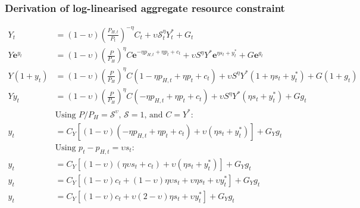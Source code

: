 \subsubsection{Derivation of log-linearised aggregate resource constraint}
\begin{align}\label{eq:appendix_log_rc_beginning}
    Y_t &= (1-\upsilon)\left(\frac{P_{H,t}}{P_t}\right)^{-\eta}C_t + \upsilon \mathcal{S}_t^{\eta}Y_t^* + G_t\\
    Y \mathbf{e}^{y_t} &= (1-\upsilon)\left(\frac{P}{P_{H}}\right)^{\eta}C \mathbf{e}^{-\eta p_{H,t} + \eta p_t + c_t}+ \upsilon S^{\eta} Y^* \mathbf{e}^{\eta s_t + y^*_t} + G \mathbf{e}^{g_t}\\
    Y ({1+y_t}) &= (1-\upsilon)\left(\frac{P}{P_{H}}\right)^{\eta}C ({1 -\eta p_{H,t} + \eta p_t + c_t})+ \upsilon S^{\eta} Y^* ({1 + \eta s_t + y^*_t}) + G ({1+ g_t})\\
    Y y_t &= (1-\upsilon)\left(\frac{P}{P_{H}}\right)^{\eta}C ({-\eta p_{H,t} + \eta p_t + c_t})+ \upsilon S^{\eta} Y^* ({\eta s_t + y^*_t}) + G g_t\\
    &\text{Using $P/P_H = \mathcal{S}^\upsilon$, $\mathcal{S} = 1$, and $C=Y^*$}:\nonumber\\
    y_t &= C_Y\left[(1-\upsilon)({-\eta p_{H,t} + \eta p_t + c_t})+ \upsilon ({\eta s_t + y^*_t})\right] + G_Y g_t\\
    &\text{Using $p_t - p_{H,t} = \upsilon s_t$}:\nonumber\\
    y_t &= C_Y\left[(1-\upsilon)({\eta \upsilon s_t + c_t})+ \upsilon ({\eta s_t + y^*_t})\right] + G_Y g_t\\
    y_t &= C_Y\left[(1-\upsilon)c_t + (1-\upsilon) \eta \upsilon s_t + \upsilon {\eta s_t} + \upsilon y^*_t\right] + G_Y g_t\\
    y_t &= C_Y\left[(1-\upsilon)c_t + \upsilon (2-\upsilon)\eta s_t + \upsilon y^*_t\right] + G_Y g_t \label{eq:appendix_log_rc_end}
\end{align}
\newpage